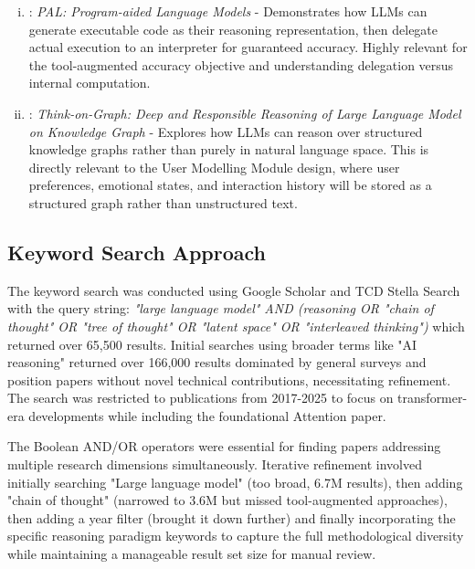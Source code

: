 \documentclass[a4paper,oneside,12pt]{book}
\numberwithin{equation}{chapter} %
\begin{document}
\begin{enumerate} [(i)]
\item \cite{gao2023palprogramaidedlanguagemodels}: \textit{PAL: Program-aided Language Models} - Demonstrates how LLMs can generate executable code as their reasoning representation, then delegate actual execution to an interpreter for guaranteed accuracy. Highly relevant for the tool-augmented accuracy objective and understanding delegation versus internal computation.

\item \cite{sun2024thinkongraphdeepresponsiblereasoning}: \textit{Think-on-Graph: Deep and Responsible Reasoning of Large Language Model on Knowledge Graph} - Explores how LLMs can reason over structured knowledge graphs rather than purely in natural language space. This is directly relevant to the User Modelling Module design, where user preferences, emotional states, and interaction history will be stored as a structured graph rather than unstructured text. 

\end{enumerate}

\subsection{Keyword Search Approach}

The keyword search was conducted using Google Scholar and TCD Stella Search with the query string: \textit{"large language model" AND (reasoning OR "chain of thought" OR "tree of thought" OR "latent space" OR "interleaved thinking")} which returned over 65,500 results. Initial searches using broader terms like "AI reasoning" returned over 166,000 results dominated by general surveys and position papers without novel technical contributions, necessitating refinement. The search was restricted to publications from 2017-2025 to focus on transformer-era developments while including the foundational Attention paper.

The Boolean AND/OR operators were essential for finding papers addressing multiple research dimensions simultaneously. Iterative refinement involved initially searching "Large language model" (too broad, 6.7M results), then adding "chain of thought" (narrowed to 3.6M but missed tool-augmented approaches), then adding a year filter (brought it down further) and finally incorporating the specific reasoning paradigm keywords to capture the full methodological diversity while maintaining a manageable result set size for manual review.
\end{document}
